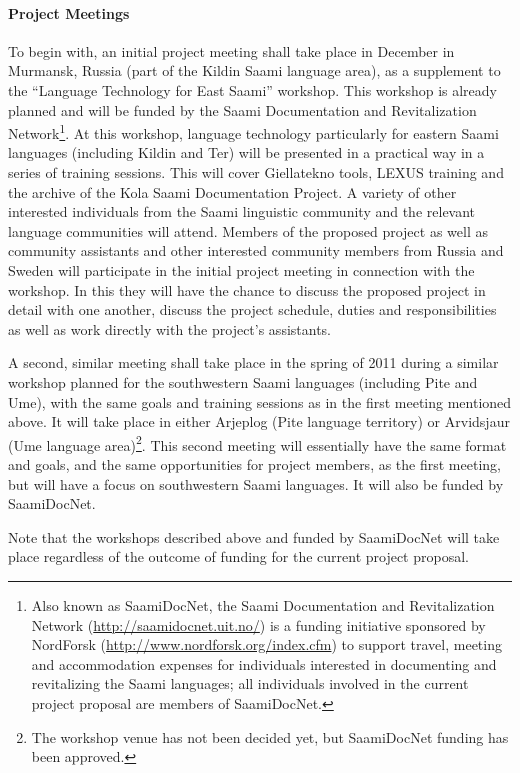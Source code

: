 \documentclass[a4paper,12pt]{article}
\begin{document}
{{{{\paragraph{Project Meetings}\label{meetings}
To begin with, an initial project meeting shall take place in December in Murmansk, Russia (part of the Kildin Saami language area), as a supplement to the “Language Technology for East Saami” workshop. This workshop is already planned and will be funded by the Saami Documentation and Revitalization Network\footnote{Also known as SaamiDocNet, the Saami Documentation and Revitalization Network (\url{http://saamidocnet.uit.no/}) is a funding initiative sponsored by NordForsk (\url{http://www.nordforsk.org/index.cfm}) to support travel, meeting and accommodation expenses for individuals interested in documenting and revitalizing the Saami languages; all individuals involved in the current project proposal are members of SaamiDocNet.}. At this workshop, language technology particularly for eastern Saami languages (including Kildin and Ter) will be presented in a practical way in a series of training sessions. This will cover Giellatekno tools, LEXUS training and the archive of the Kola Saami Documentation Project. A variety of other interested individuals from the Saami linguistic community and the relevant language communities will attend. Members of the proposed project as well as community assistants and other interested community members from Russia and Sweden will participate in the initial project meeting in connection with the workshop. In this they will have the chance to discuss the proposed project in detail with one another, discuss the project schedule, duties and responsibilities as well as work directly with the project's assistants.

A second, similar meeting shall take place in the spring of 2011 during a similar workshop planned for the southwestern Saami languages (including Pite and Ume), with the same goals and training sessions as in the first meeting mentioned above. It will take place in either Arjeplog (Pite language territory) or Arvidsjaur (Ume language area)\footnote{The workshop venue has not been decided yet, but SaamiDocNet funding has been approved.}. This second meeting will essentially have the same format and goals, and the same opportunities for project members, as the first meeting, but will have a focus on southwestern Saami languages. It will also be funded by SaamiDocNet.

Note that the workshops described above and funded by SaamiDocNet will take place regardless of the outcome of funding for the current project proposal.

}}}}
\end{document}
